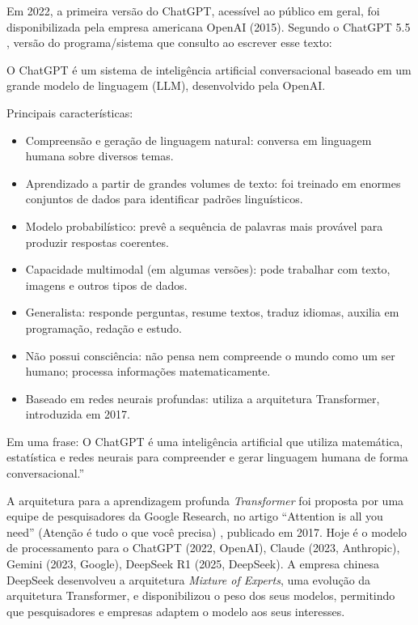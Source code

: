 \documentclass{hipatia}
\begin{document}
	Em 2022, a primeira versão do ChatGPT, acessível ao público em geral, foi disponibilizada pela empresa americana OpenAI (2015). Segundo o ChatGPT 5.5 \cite{OpenAI2026}, versão do programa/sistema que consulto ao escrever esse texto:

\vspace{0,3cm}

O ChatGPT é um sistema de inteligência artificial conversacional baseado em um grande modelo de linguagem (LLM), desenvolvido pela OpenAI.

Principais características:

\begin{itemize}
    \item Compreensão e geração de linguagem natural: conversa em linguagem humana sobre diversos temas.
\item Aprendizado a partir de grandes volumes de texto: foi treinado em enormes conjuntos de dados para identificar padrões linguísticos.
\item Modelo probabilístico: prevê a sequência de palavras mais provável para produzir respostas coerentes.
\item Capacidade multimodal (em algumas versões): pode trabalhar com texto, imagens e outros tipos de dados.
\item Generalista: responde perguntas, resume textos, traduz idiomas, auxilia em programação, redação e estudo.
\item Não possui consciência: não pensa nem compreende o mundo como um ser humano; processa informações matematicamente.
\item Baseado em redes neurais profundas: utiliza a arquitetura Transformer, introduzida em 2017.
\end{itemize}


Em uma frase: O ChatGPT é uma inteligência artificial que utiliza matemática, estatística e redes neurais para compreender e gerar linguagem humana de forma conversacional.''



\vspace{0,3cm}

A arquitetura para a aprendizagem profunda \textit{Transformer} foi proposta por uma equipe de pesquisadores da Google Research, no artigo ``Attention is all you need'' (Atenção é tudo o que você precisa) 	\cite{Vaswani2017}, publicado em 2017. Hoje é o modelo de processamento para o ChatGPT (2022, OpenAI), Claude (2023, Anthropic), Gemini (2023, Google), DeepSeek R1 (2025, DeepSeek). A empresa chinesa DeepSeek desenvolveu a arquitetura \textit{Mixture of Experts}, uma evolução da arquitetura Transformer, e disponibilizou o peso dos seus modelos, permitindo que pesquisadores e empresas adaptem o modelo aos seus interesses.
	
\end{document}
